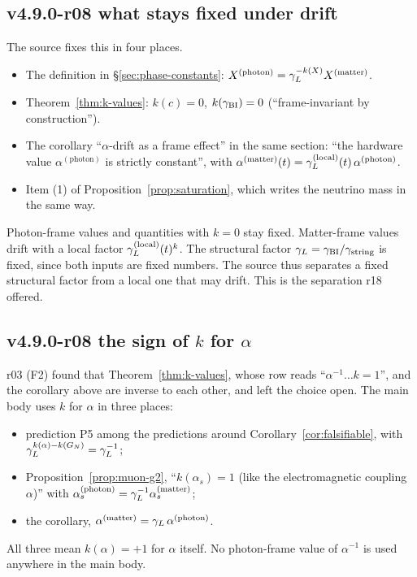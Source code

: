 \subsection*{v4.9.0-r08 what stays fixed under drift}
\label{subsec:v490-r08-fixed}

The source fixes this in four places.
\begin{itemize}[leftmargin=2em]
\item The definition in \S\ref{sec:phase-constants}: \(X^{(\mathrm{photon})}=\gamma_L^{-k(X)}X^{(\mathrm{matter})}\).
\item Theorem~\ref{thm:k-values}: \(k(c)=0\), \(k(\gamma_{\mathrm{BI}})=0\) (``frame-invariant by construction'').
\item The corollary ``\(\alpha\)-drift as a frame effect'' in the same section: ``the hardware value
\(\alpha^{(\mathrm{photon})}\) is strictly constant'', with \(\alpha^{(\mathrm{matter})}(t)=\gamma_L^{(\mathrm{local})}(t)\,
\alpha^{(\mathrm{photon})}\).
\item Item (1) of Proposition~\ref{prop:saturation}, which writes the neutrino mass in the same way.
\end{itemize}
Photon-frame values and quantities with \(k=0\) stay fixed.  Matter-frame values drift with a local factor
\(\gamma_L^{(\mathrm{local})}(t)^{k}\).  The structural factor \(\gamma_L=\gamma_{\mathrm{BI}}/\gamma_{\mathrm{string}}\) is fixed, since both inputs are fixed
numbers.  The source thus separates a fixed structural factor from a local one that may drift.  This is the separation
r18 offered.

\subsection*{v4.9.0-r08 the sign of \texorpdfstring{$k$}{k} for \texorpdfstring{$\alpha$}{alpha}}
\label{subsec:v490-r08-alpha-sign}

r03 (F2) found that Theorem~\ref{thm:k-values}, whose row reads ``\(\alpha^{-1}\ldots k=1\)'', and the corollary above are
inverse to each other, and left the choice open.  The main body uses \(k\) for \(\alpha\) in three places:
\begin{itemize}[leftmargin=2em]
\item prediction P5 among the predictions around Corollary~\ref{cor:falsifiable}, with
\(\gamma_L^{k(\alpha)-k(G_N)}=\gamma_L^{-1}\);
\item Proposition~\ref{prop:muon-g2}, ``\(k(\alpha_s)=1\) (like the electromagnetic coupling \(\alpha\))'' with
\(\alpha_s^{(\mathrm{photon})}=\gamma_L^{-1}\alpha_s^{(\mathrm{matter})}\);
\item the corollary, \(\alpha^{(\mathrm{matter})}=\gamma_L\,\alpha^{(\mathrm{photon})}\).
\end{itemize}
All three mean \(k(\alpha)=+1\) for \(\alpha\) itself.  No photon-frame value of \(\alpha^{-1}\) is used anywhere in the main
body.

